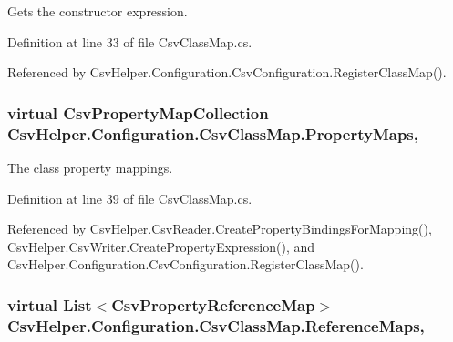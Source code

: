 Gets the constructor expression. 



Definition at line 33 of file Csv\-Class\-Map.\-cs.



Referenced by Csv\-Helper.\-Configuration.\-Csv\-Configuration.\-Register\-Class\-Map().

\hypertarget{a00059_a9580e897abcba144f3101eb983348e25}{
\subsubsection[{Property\-Maps}]{\setlength{\rightskip}{0pt plus 5cm}virtual {\bf Csv\-Property\-Map\-Collection} Csv\-Helper.\-Configuration.\-Csv\-Class\-Map.\-Property\-Maps\hspace{0.3cm}{\ttfamily [get]}, {\ttfamily [inherited]}}}\label{a00059_a9580e897abcba144f3101eb983348e25}


The class property mappings. 



Definition at line 39 of file Csv\-Class\-Map.\-cs.



Referenced by Csv\-Helper.\-Csv\-Reader.\-Create\-Property\-Bindings\-For\-Mapping(), Csv\-Helper.\-Csv\-Writer.\-Create\-Property\-Expression(), and Csv\-Helper.\-Configuration.\-Csv\-Configuration.\-Register\-Class\-Map().

\hypertarget{a00059_a6dfbf8f743b16d2ec83edef865ea2d9e}{
\subsubsection[{Reference\-Maps}]{\setlength{\rightskip}{0pt plus 5cm}virtual List$<${\bf Csv\-Property\-Reference\-Map}$>$ Csv\-Helper.\-Configuration.\-Csv\-Class\-Map.\-Reference\-Maps\hspace{0.3cm}{\ttfamily [get]}, {\ttfamily [inherited]}}}\label{a00059_a6dfbf8f743b16d2ec83edef865ea2d9e}



